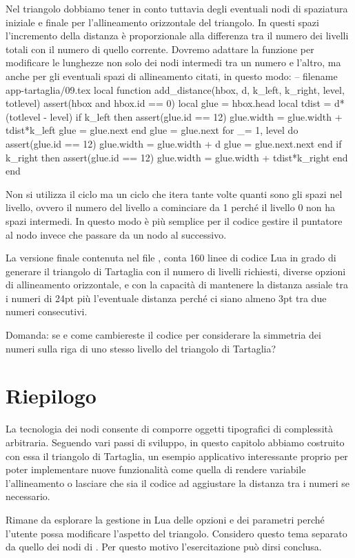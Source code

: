 Nel triangolo dobbiamo tener in conto tuttavia degli eventuali nodi di
spaziatura iniziale e finale per l'allineamento orizzontale del triangolo. In
questi spazi l'incremento della distanza è proporzionale alla differenza tra il
numero dei livelli totali con il numero di quello corrente. Dovremo adattare la
funzione  per modificare le lunghezze non solo dei nodi
intermedi tra un numero e l'altro, ma anche per gli eventuali spazi di
allineamento citati, in questo modo:
\lines
-- filename app-tartaglia/09.tex
local
function add_distance(hbox, d, k_left, k_right, level, totlevel)
    assert(hbox and hbox.id == 0)
    local glue = hbox.head
    local tdist = d*(totlevel - level)
    if k_left then
        assert(glue.id == 12)
        glue.width = glue.width + tdist*k_left
        glue = glue.next
    end
    glue = glue.next
    for _= 1, level do
        assert(glue.id == 12)
        glue.width = glue.width + d
        glue = glue.next.next
    end
    if k_right then
        assert(glue.id == 12)
        glue.width = glue.width +  tdist*k_right
    end
end
\endlines
{}

Non si utilizza il ciclo  ma un ciclo  che itera tante
volte quanti sono gli spazi nel livello, ovvero il numero del livello a
cominciare da 1 perché il livello 0 non ha spazi intermedi. In questo modo è più
semplice per il codice gestire il puntatore al nodo invece che passare da un
nodo al successivo.

La versione finale contenuta nel file , conta 160
linee di codice Lua in grado di generare il triangolo di Tartaglia con il numero
di livelli richiesti, diverse opzioni di allineamento orizzontale, e con la
capacità di mantenere la distanza assiale tra i numeri di 24pt più l'eventuale
distanza perché ci siano almeno 3pt tra due numeri consecutivi.

Domanda: se e come cambiereste il codice per considerare la simmetria dei numeri
sulla riga di uno stesso livello del triangolo di Tartaglia?


\section{Riepilogo}

La tecnologia dei nodi consente di comporre oggetti tipografici di complessità
arbitraria. Seguendo vari passi di sviluppo, in questo capitolo abbiamo
costruito con essa il triangolo di Tartaglia, un esempio applicativo
interessante proprio per poter implementare nuove funzionalità come quella di
rendere variabile l'allineamento o lasciare che sia il codice ad aggiustare la
distanza tra i numeri se necessario.

Rimane da esplorare la gestione in Lua delle opzioni e dei parametri perché
l'utente possa modificare l'aspetto del triangolo. Considero questo tema
separato da quello dei nodi di \LuaTeX{}. Per questo motivo l'esercitazione
può dirsi conclusa.


